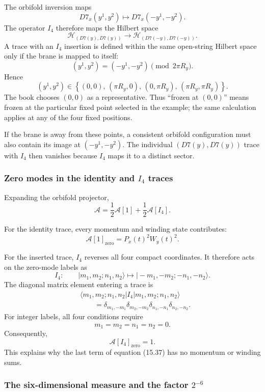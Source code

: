 \documentclass[
  10pt,
  a4paper,
  openany]{book}
\begin{document}
The orbifold inversion maps \[
D7_x(y^1,y^2)
\longmapsto
D7_x(-y^1,-y^2).
\] The operator \(I_4\) therefore maps the Hilbert space \[
\mathcal H_{(D7(y),D7(y))}
\longrightarrow
\mathcal H_{(D7(-y),D7(-y))}.
\] A trace with an \(I_4\) insertion is defined within the same
open-string Hilbert space only if the brane is mapped to itself: \[
(y^1,y^2)
=
(-y^1,-y^2)
\pmod{2\pi R_y}.
\] Hence \[
\boxed{
(y^1,y^2)
\in
\left\{
(0,0),\,
(\pi R_y,0),\,
(0,\pi R_y),\,
(\pi R_y,\pi R_y)
\right\}.
}
\] The book chooses \((0,0)\) as a representative. Thus ``frozen at
\((0,0)\)'' means frozen at the particular fixed point selected in the
example; the same calculation applies at any of the four fixed
positions.

If the brane is away from these points, a consistent orbifold
configuration must also contain its image at \((-y^1,-y^2)\). The
individual \((D7(y),D7(y))\) trace with \(I_4\) then vanishes because
\(I_4\) maps it to a distinct sector.

\subsubsection{\texorpdfstring{Zero modes in the identity and \(I_4\)
traces}{Zero modes in the identity and I\_4 traces}}\label{zero-modes-in-the-identity-and-i_4-traces}

Expanding the orbifold projector, \[
\mathcal A
=
\frac12\mathcal A[1]
+
\frac12\mathcal A[I_4].
\]

For the identity trace, every momentum and winding state contributes: \[
\mathcal A[1]_{\mathrm{zero}}
=
P_x(t)^2W_y(t)^2.
\]

For the inserted trace, \(I_4\) reverses all four compact coordinates.
It therefore acts on the zero-mode labels as \[
I_4:
\qquad
|m_1,m_2;n_1,n_2\rangle
\longmapsto
|-m_1,-m_2;-n_1,-n_2\rangle.
\] The diagonal matrix element entering a trace is \[
\begin{aligned}
&\langle m_1,m_2;n_1,n_2|
I_4
|m_1,m_2;n_1,n_2\rangle\\
&\qquad=
\delta_{m_1,-m_1}
\delta_{m_2,-m_2}
\delta_{n_1,-n_1}
\delta_{n_2,-n_2}.
\end{aligned}
\] For integer labels, all four conditions require \[
m_1=m_2=n_1=n_2=0.
\] Consequently, \[
\boxed{
\mathcal A[I_4]_{\mathrm{zero}}=1.
}
\] This explains why the last term of equation (15.37) has no momentum
or winding sums.

\subsubsection{\texorpdfstring{The six-dimensional measure and the
factor
\(2^{-6}\)}{The six-dimensional measure and the factor 2\^{}\{-6\}}}\label{the-six-dimensional-measure-and-the-factor-2-6}
\end{document}
